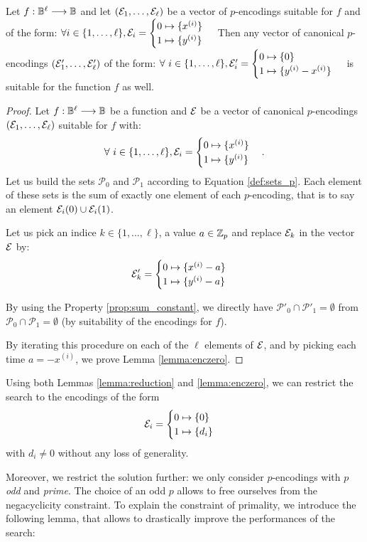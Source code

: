 \begin{lemma}
    Let $f: \mathbb{B}^\ell \longrightarrow \mathbb{B}$ and let $(\mathcal{E}_1, \dots, \mathcal{E}_\ell)$ be a vector of $p$-encodings suitable for $f$ and of the form: $\forall i \in \{1, \dots, \ell\}, \mathcal{E}_i = \begin{cases} 0 \mapsto \{x^{(i)}\} \\ 1 \mapsto \{y^{(i)}\} \end{cases}$
    Then any vector of canonical $p$-encodings $(\mathcal{E}'_1, \dots, \mathcal{E}'_\ell)$ of the form: $\forall~i \in \{1, \dots, \ell\}, \mathcal{E}'_i = \begin{cases} 0 \mapsto \{0\} \\ 1 \mapsto \{y^{(i)} - x^{(i)}\} \end{cases}$
    is suitable for the function $f$ as well.
    \label{lemma:enczero}
\end{lemma}


\begin{proof}
Let $f: \mathbb{B}^\ell \longrightarrow \mathbb{B}$ be a function and $\mathcal{E}$ be a vector of canonical $p$-encodings $(\mathcal{E}_1, \dots, \mathcal{E}_\ell)$ suitable for $f$ with:
$$
\forall~i \in \{1, \dots, \ell\}, \mathcal{E}_i = \begin{cases} 0 \mapsto \{x^{(i)}\} \\ 1 \mapsto \{y^{(i)}\} \end{cases}.
$$
Let us build the sets $\mathcal{P}_0$ and $\mathcal{P}_1$ according to Equation \ref{def:sets_p}. Each element of these sets is the sum of exactly one element of each $p$-encoding, that is to say an element $\mathcal{E}_i(0) \cup \mathcal{E}_i(1)$.

Let us pick an indice $k \in \{1, \dots, \ell\}$, a value $a \in \mathbb{Z}_p$ and replace $\mathcal{E}_k$ in the vector $\mathcal{E}$ by: 
$$
\mathcal{E}'_k = \begin{cases} 0 \mapsto \{x^{(i)} - a\} \\ 1 \mapsto \{y^{(i)} - a\} \end{cases}
$$

By using the Property \ref{prop:sum_constant}, we directly have $\mathcal{P}'_0 \cap \mathcal{P}'_1 = \emptyset$ from $\mathcal{P}_0 \cap \mathcal{P}_1 = \emptyset$ (by suitability of the encodings for $f$).

By iterating this procedure on each of the $\ell$ elements of $\mathcal{E}$, and by picking each time $a = -x^{(i)}$, we prove Lemma \ref{lemma:enczero}.
\end{proof}



Using both Lemmas \ref{lemma:reduction} and \ref{lemma:enczero}, we can restrict the search to the encodings of the form $$\mathcal{E}_i = \begin{cases} 0 \mapsto \{0\} \\ 1 \mapsto \{d_i\} \end{cases}$$ with $d_i \ne 0$ without any loss of generality. 


Moreover, we restrict the solution further: we only consider $p$-encodings with $p$ \emph{odd} and \emph{prime}. The choice of an odd $p$ allows to free ourselves from the negacyclicity constraint. To explain the constraint of primality, we introduce the following lemma, that allows to drastically improve the performances of the search:

